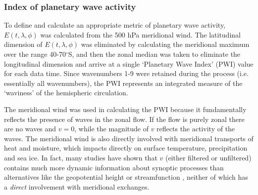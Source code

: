 \subsubsection{Index of planetary wave activity}

To define and calculate an appropriate metric of planetary wave activity, $E(t,\lambda,\phi)$ was calculated from the 500 hPa meridional wind. The latitudinal dimension of $E(t,\lambda,\phi)$ was eliminated by calculating the meridional maximum over the range 40-70$^{\circ}$S, and then the zonal median was taken to eliminate the longitudinal dimension and arrive at a single `Planetary Wave Index' (PWI) value for each data time. Since wavenumbers 1-9 were retained during the process (i.e. essentially all wavenumbers), the PWI represents an integrated measure of the `waviness' of the hemispheric circulation.

The meridional wind was used in calculating the PWI because it fundamentally reflects the presence of waves in the zonal flow. If the flow is purely zonal there are no waves and $v = 0$, while the magnitude of $v$ reflects the activity of the waves. The meridional wind is also directly involved with meridional transports of heat and moisture, which impacts directly on surface temperature, precipitation and sea ice. In fact, many studies have shown that $v$ (either filtered or unfiltered) contains much more dynamic information about synoptic processes than alternatives like the geopotential height or streamfunction \citep[e.g.][]{Berbery1996,Hoskins2005,Petoukhov2013}, neither of which has a \textit{direct} involvement with meridional exchanges. 

